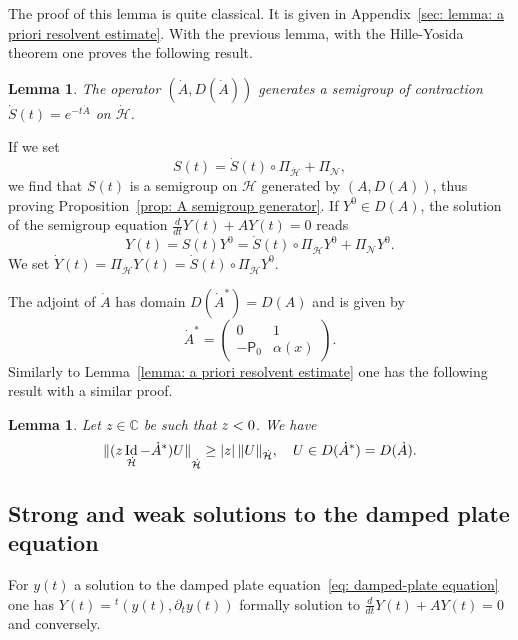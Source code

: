 \documentclass[JEP,XML,SOM,Unicode,published]{cedram}
\theoremstyle{plain}
\newtheorem{lemma}[theorem]{Lemma}
\theoremstyle{definition}
\def\C{\mathbb{C}}
\let \Re \relax
\DeclareMathOperator{\Re}{Re}
\renewcommand{\H}{{\mathcal H}}
\newcommand{\transp}{\ensuremath{\phantom{}^{t}}}
\newcommand{\Norm}[2]{{\| #1 \|}_{#2}}
\newcommand{\Pell}{\mathsf P_0}
\DeclareMathOperator{\id}{Id}
\begin{document}
The proof of this lemma is quite classical. It is given in
Appendix~\ref{sec: lemma: a priori resolvent estimate}.
With the previous lemma, with the Hille-Yosida theorem one
proves the following result.

\begin{lemma}
\label{lemma: reduced generator}
The operator $(\dot A, D(\dot A))$ generates a semigroup of
contraction
$\dot S(t) = e^{- t \dot A}$ on $\dot{\H}$.
\end{lemma}
If we set
\begin{equation}
\label{eq: semigroup}
S(t) = \dot{S}(t) \circ \Pi_{\dot{\H}} + \Pi_{\mathcal N},
\end{equation}
we find that $S(t)$ is a semigroup on $\H$ generated by $(A,D(A))$,
thus proving Proposition~\ref{prop: A semigroup generator}.
If $Y^0 \in D(A)$, the solution of the semigroup equation
$\frac{d}{d t} Y(t) + A Y(t) =0$ reads
\begin{equation}
\label{eq: semigroup solution}
Y(t)= S(t) Y^0= \dot{S}(t) \circ \Pi_{\dot{\H}} Y^0 +
\Pi_{\mathcal N} Y^0.
\end{equation}
We set $\dot{Y}(t) = \Pi_{\dot{\H}} Y(t) = \dot{S}(t) \circ \Pi_{\dot{\H}} Y^0$.

The adjoint of $\dot A$ has domain $D(\dot A^*) = D(A)$ and is given
by
\begin{equation*}
\dot A^* = \begin{pmatrix} 0 & 1\\ -\Pell & \alpha(x) \end{pmatrix}.
\end{equation*}
Similarly to Lemma~\ref{lemma: a priori resolvent estimate} one has
the following result with a similar proof.
\begin{lemma}
\label{lemma: a priori resolvent estimate bis}
Let $z \in \C$ be such that $\Re z<0$. We have
\begin{equation*}
\Norm{(z \id_{\dot{\H}} - \dot A^*) U}{\dot{\H}} \geq |\Re z| \,
\Norm{U}{\dot{\H}}, \quad U \in D(\dot A^*) = D(\dot A).
\end{equation*}
\end{lemma}

\subsection{Strong and weak solutions to the damped plate equation}
\label{sec: Strong and weak solutions}
For $y(t)$ a solution to the damped plate equation~\eqref{eq:
damped-plate equation} one has $Y(t) = \transp(y(t), \partial_t y(t))$
formally solution to $\frac{d}{d t} Y(t) + A Y(t) =0$ and conversely.
\end{document}
